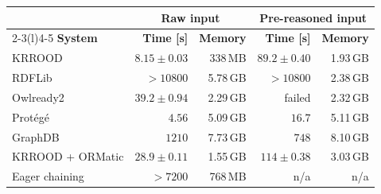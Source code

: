 \begin{tabular}{@{}lrrrr@{}}
\toprule
 & \multicolumn{2}{c}{\textbf{Raw input}} & \multicolumn{2}{c}{\textbf{Pre-reasoned input}}\\
\cmidrule(lr){2-3}\cmidrule(l){4-5}
\textbf{System} & \textbf{Time [s]} & \textbf{Memory} & \textbf{Time [s]} & \textbf{Memory}\\
\midrule
KRROOD & $8.15 \pm 0.03$ & 338\,MB & $89.2 \pm 0.40$ & 1.93\,GB\\
RDFLib & $>10800$ & 5.78\,GB & $>10800$ & 2.38\,GB\\
Owlready2 & $39.2 \pm 0.94$ & 2.29\,GB & failed & 2.32\,GB\\
Prot\'eg\'e & $\mathbf{4.56}$ & 5.09\,GB & $\mathbf{16.7}$ & 5.11\,GB\\
GraphDB & $1210$ & 7.73\,GB & $748$ & 8.10\,GB\\
KRROOD + ORMatic & $28.9 \pm 0.11$ & 1.55\,GB & $114 \pm 0.38$ & 3.03\,GB\\
Eager chaining & $>7200$ & 768\,MB & n/a & n/a\\
\bottomrule
\end{tabular}
